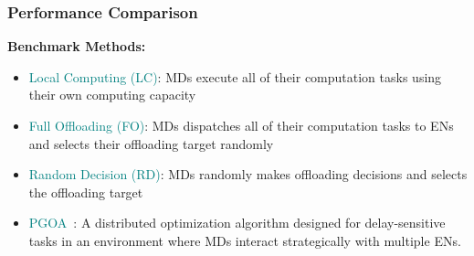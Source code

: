 \begin{frame}
	\frametitle{Performance Comparison}
	
	\textbf{Benchmark Methods:}
			\vspace{4mm}
	
	\begin{itemize}[]
		
		\item \textcolor{teal}{Local Computing (LC)}:  MDs execute all of their computation tasks using their own computing capacity 
					\vspace{2mm}
		\item \textcolor{teal}{Full Offloading (FO)}: MDs dispatches all of their computation tasks to ENs and selects their offloading target randomly
					\vspace{2mm}
		\item \textcolor{teal}{Random Decision (RD)}: MDs randomly makes offloading decisions and selects the offloading target 
					\vspace{2mm}
		\item \textcolor{teal}{PGOA}~\cite{yang2018distributed}: A distributed optimization algorithm designed for delay-sensitive tasks in an environment where MDs interact strategically with multiple ENs.
		
	\end{itemize}
	
\end{frame}

